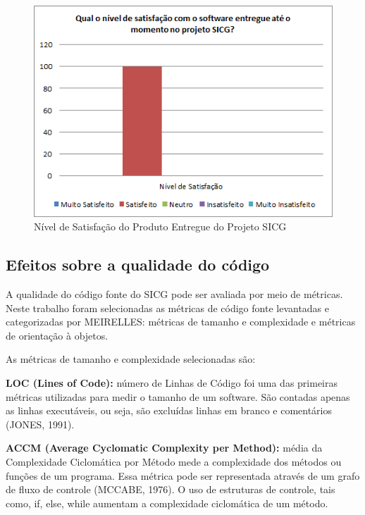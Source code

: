\begin{figure}[H]
		\centering
			\includegraphics[scale=1.0]{figuras/satisfacao.png}
		\caption{Nível de Satisfação do Produto Entregue do Projeto SICG}
		\label{satisfacao}
\end{figure}

\subsection[Efeitos sobre a qualidade do código]{Efeitos sobre a qualidade do código}

A qualidade do código fonte do SICG pode ser avaliada por meio de métricas. Neste trabalho foram selecionadas as métricas de código fonte levantadas e categorizadas por MEIRELLES: métricas de tamanho e complexidade e métricas de orientação à objetos. 

As métricas de tamanho e complexidade selecionadas são: 

\textbf{LOC (Lines of Code):} número de Linhas de Código foi uma das primeiras métricas
utilizadas para medir o tamanho de um software. São contadas apenas as linhas
executáveis, ou seja, são excluídas linhas em branco e comentários (JONES,
1991).

 \vspace{\onelineskip} 

\textbf{ACCM (Average Cyclomatic Complexity per Method):} média da Complexidade
Ciclomática por Método mede a complexidade dos métodos ou funções
de um programa. Essa métrica pode ser representada através de um grafo de fluxo
de controle (MCCABE, 1976). O uso de estruturas de controle, tais como, if, else,
while aumentam a complexidade ciclomática de um método.

